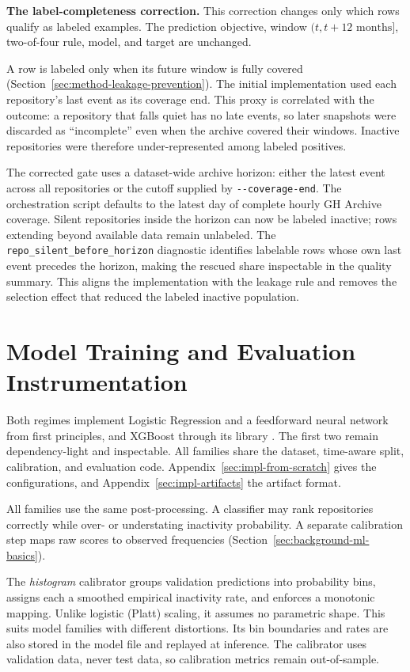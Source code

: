 \label{sec:impl-label-completeness}
\textbf{The label-completeness correction.} This correction changes only which
rows qualify as labeled examples. The prediction objective, window
\((t, t + 12\text{ months}]\), two-of-four rule, model, and target are unchanged.

A row is labeled only when its future window is fully covered
(Section~\ref{sec:method-leakage-prevention}). The initial implementation used
each repository's last event as its coverage end. This proxy is correlated with
the outcome: a repository that falls quiet has no late events, so later snapshots
were discarded as ``incomplete'' even when the archive covered their windows.
Inactive repositories were therefore under-represented among labeled positives.

The corrected gate uses a dataset-wide archive horizon: either the latest event
across all repositories or the cutoff supplied by
\texttt{-{}-coverage-end}. The orchestration script defaults to the latest day
of complete hourly GH Archive coverage. Silent repositories inside the horizon
can now be labeled inactive; rows extending beyond available data remain
unlabeled. The \texttt{repo\_silent\_before\_horizon} diagnostic identifies
labelable rows whose own last event precedes the horizon, making the rescued
share inspectable in the quality summary. This aligns the implementation with
the leakage rule and removes the selection effect that reduced the labeled
inactive population.

\section{Model Training and Evaluation Instrumentation}
\label{sec:impl-models}

Both regimes implement Logistic Regression and a feedforward neural network from
first principles, and XGBoost through its library \cite{chen2016xgboost}. The
first two remain dependency-light and inspectable. All families share the
dataset, time-aware split, calibration, and evaluation code.
Appendix~\ref{sec:impl-from-scratch} gives the configurations, and
Appendix~\ref{sec:impl-artifacts} the artifact format.

All families use the same post-processing. A classifier may rank repositories
correctly while over- or understating inactivity probability. A separate
calibration step maps raw scores to observed frequencies
(Section~\ref{sec:background-ml-basics}).

The \emph{histogram} calibrator groups validation predictions into probability
bins, assigns each a smoothed empirical inactivity rate, and enforces a monotonic
mapping. Unlike logistic (Platt) scaling, it assumes no parametric shape. This
suits model families with different distortions. Its bin boundaries and rates
are also stored in the model file and replayed at inference. The calibrator uses
validation data, never test data, so calibration metrics remain
out-of-sample.

